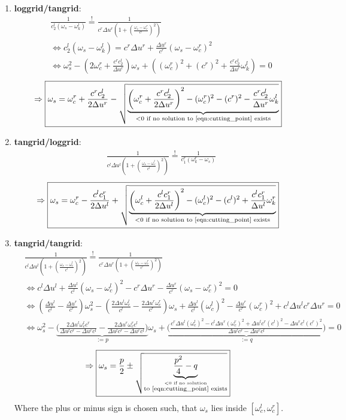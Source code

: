 \begin{enumerate}
	\item {\bf loggrid/tangrid}:
		\begin{align*}
			&\frac{1}{c_2^l(\omega_s-\omega_k^l)}\stackrel{!}{=}\frac{1}{c^r\Delta u^r\left(1+\left(\frac{\omega_s-\omega_c^r}{c^r}\right)^2\right)}\\
			&\Leftrightarrow c_2^l(\omega_s-\omega_k^l) = c^r \Delta u^r + \frac{\Delta u^r}{c^r} (\omega_s-\omega_c^r)^2\\
			&\Leftrightarrow \omega_s^2 - \left(2\omega_c^r + \frac{c^r c_2^l}{\Delta u^r}\right) \omega_s + \left((\omega_c^{r})^2 + (c^r)^2 + \frac{c^r c_2^l}{\Delta u^r} \omega_k^l \right) =0
		\end{align*}
		\[
		 	\Rightarrow \boxed{\omega_s= \omega_c^r + \frac{c^r c_2^l}{2 \Delta u^r} - \sqrt{\underbrace{\left(\omega_c^r + \frac{c^r c_2^l}{2 \Delta u^r}\right)^2 - (\omega_c^{r})^2 - (c^r)^2 - \frac{c^r c_2^l}{\Delta u^r} \omega_k^l }_{<0 \text{ if no solution to \ref{eqn:cutting_point} exists}}}}
		\]
	\item {\bf tangrid/loggrid}:
		\begin{align*}
			&\frac{1}{c^l\Delta u^l\left(1+\left(\frac{\omega_s-\omega_c^l}{c^l}\right)^2\right)}\stackrel{!}{=}\frac{1}{c_1^r(\omega_k^r-\omega_s)}
		\end{align*}
		\[
		 	\Rightarrow \boxed{\omega_s= \omega_c^r - \frac{c^l c_1^r}{2 \Delta u^l} + \sqrt{\underbrace{\left(\omega_c^l + \frac{c^l c_1^r}{2 \Delta u^l}\right)^2 - (\omega_c^{l})^2 - (c^l)^2 + \frac{c^l c_1^r}{\Delta u^l} \omega_k^r }_{<0 \text{ if no solution to \ref{eqn:cutting_point} exists}} }}
		\]
	\item {\bf tangrid/tangrid}:
		\begin{align*}
			&\frac{1}{c^l\Delta u^l\left(1+\left(\frac{\omega_s-\omega_c^l}{c^l}\right)^2\right)}\stackrel{!}{=}\frac{1}{c^r\Delta u^r\left(1+\left(\frac{\omega_s-\omega_c^r}{c^r}\right)^2\right)}\\
			&\Leftrightarrow c^l\Delta u^l + \frac{\Delta u^l}{c^l}(\omega_s - \omega_c^l)^2 - c^r \Delta u^r - \frac{\Delta u^r}{c^r}(\omega_s - \omega_c^r)^2 = 0 \\
			&\Leftrightarrow \left( \frac{\Delta u^l}{c^l} - \frac{\Delta u^r}{c^r}\right) \omega_s^2 - \left( \frac{2\Delta u^l \omega_c^l}{c^l} - \frac{2 \Delta u^r \omega_c^r}{c^r} \right) \omega_s + \frac{\Delta u^l}{c^l}(\omega_c^l)^2 - \frac{\Delta u^r}{c^r}(\omega_c^r)^2 + c^l\Delta u^l c^r \Delta u^r = 0\\
			&\Leftrightarrow \omega_s^2 - \underbrace{\biggl(\frac{2\Delta u^l \omega_c^l c^r}{\Delta u^l c^r - \Delta u^r c^l} - \frac{2\Delta u^r \omega_c^r c^l}{\Delta u^l c^r - \Delta u^r c^l} \biggr)}_{:=p} \omega_s + \underbrace{\biggl(\frac{c^r \Delta u^l (\omega_c^l)^2 - c^l \Delta u^r (\omega_c^r)^2 + \Delta u^l c^r (c^l)^2 - \Delta u^r c^l (c^r)^2}{\Delta u^l c^r - \Delta u^r c^l}\biggr)}_{:=q}=0
		\end{align*}
		\[
			\Rightarrow \boxed{\omega_s= \frac{p}{2} \pm \sqrt{\underbrace{\frac{p^2}{4}-q}_{\stackrel{<0 \text{ if no solution}}{\text{to \ref{eqn:cutting_point} exists} } } }}
		\]
		Where the plus or minus sign is chosen such, that $\omega_s$ lies inside $[\omega_c^l, \omega_c^r]$.


\end{enumerate}
